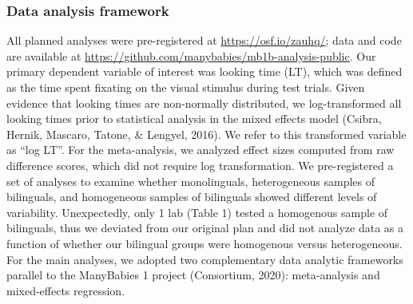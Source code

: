 \documentclass[,man,floatsintext]{apa6}
\begin{document}
\hypertarget{data-analysis-framework}{%
\subsubsection{Data analysis framework}\label{data-analysis-framework}}

All planned analyses were pre-registered at \url{https://osf.io/zauhq/}; data and code are available at \url{https://github.com/manybabies/mb1b-analysis-public}. Our primary dependent variable of interest was looking time (LT), which was defined as the time spent fixating on the visual stimulus during test trials. Given evidence that looking times are non-normally distributed, we log-transformed all looking times prior to statistical analysis in the mixed effects model (Csibra, Hernik, Mascaro, Tatone, \& Lengyel, 2016). We refer to this transformed variable as \enquote{log LT}. For the meta-analysis, we analyzed effect sizes computed from raw difference scores, which did not require log transformation. We pre-registered a set of analyses to examine whether monolinguals, heterogeneous samples of bilinguals, and homogeneous samples of bilinguals showed different levels of variability. Unexpectedly, only 1 lab (Table 1) tested a homogenous sample of bilinguals, thus we deviated from our original plan and did not analyze data as a function of whether our bilingual groups were homogenous versus heterogeneous. For the main analyses, we adopted two complementary data analytic frameworks parallel to the ManyBabies 1 project (Consortium, 2020): meta-analysis and mixed-effects regression.
\end{document}
